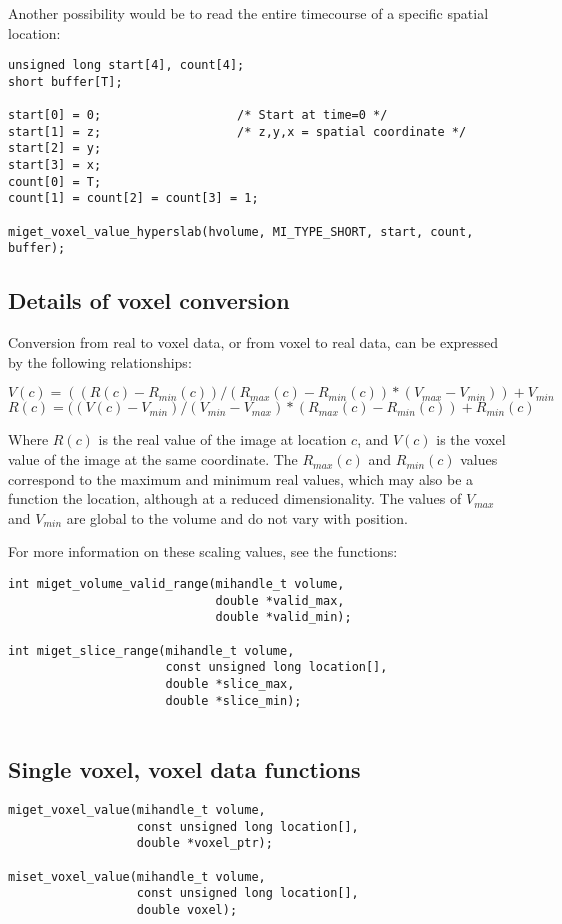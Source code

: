 \documentclass{article}
\begin{document}
Another possibility would be to read the entire timecourse of a specific
spatial location:
\begin{verbatim}
unsigned long start[4], count[4];
short buffer[T];

start[0] = 0;                   /* Start at time=0 */
start[1] = z;                   /* z,y,x = spatial coordinate */
start[2] = y;                   
start[3] = x;
count[0] = T;
count[1] = count[2] = count[3] = 1;

miget_voxel_value_hyperslab(hvolume, MI_TYPE_SHORT, start, count, buffer);
\end{verbatim}

\subsection{Details of voxel conversion}
Conversion from real to voxel data, or from voxel to real data, can
be expressed by the following relationships:

\begin{equation}
V(c) = ((R(c) - R_{min}(c)) / (R_{max}(c)-R_{min}(c)) * (V_{max} - V_{min})) + V_{min}
\end{equation}
\begin{equation}
R(c) = ((V(c) - V_{min}) / (V_{min} - V_{max}) * (R_{max}(c) - R_{min}(c)) + R_{min}(c)
\end{equation}

Where $R(c)$ is the real value of the image at location $c$, and
$V(c)$ is the voxel value of the image at the same coordinate.  The
$R_{max}(c)$ and $R_{min}(c)$ values correspond to the maximum and
minimum real values, which may also be a function the location,
although at a reduced dimensionality.  The values of $V_{max}$ and
$V_{min}$ are global to the volume and do not vary with position.

For more information on these scaling values, see the functions:
\begin{verbatim}
int miget_volume_valid_range(mihandle_t volume, 
                             double *valid_max,
                             double *valid_min);

int miget_slice_range(mihandle_t volume,
                      const unsigned long location[],
                      double *slice_max,
                      double *slice_min);
                      
\end{verbatim}

\subsection{Single voxel, voxel data functions}
\begin{verbatim}
miget_voxel_value(mihandle_t volume,
                  const unsigned long location[],
                  double *voxel_ptr);

miset_voxel_value(mihandle_t volume,
                  const unsigned long location[],
                  double voxel);
\end{verbatim}
\end{document}
